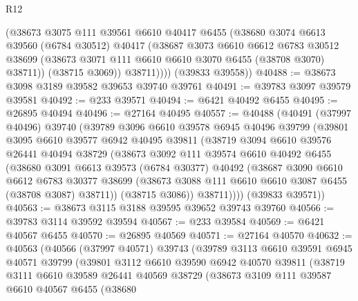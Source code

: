 \begin{lexlean}{R12}
\begin{coremodule}
            (@38673
              @3075
              @111
              @39561
              @6610
              @40417
              @6455
              (@38680
                @3074
                @6613
                @39560
                (@6784 @30512)
                @40417
                (@38687
                  @3073
                  @6610
                  @6612
                  @6783
                  @30512
                  @38699
                  (@38673 @3071 @111 @6610 @6610 @3070 @6455 (@38708 @3070) @38711))
                (@38715 @3069))
              @38711))))
      (@39833 @39558))
@40488 := @38673 @3098 @3189 @39582 @39653 @39740 @39761
@40491 := @39783 @3097 @39579 @39581
@40492 := @233 @39571
@40494 := @6421 @40492 @6455
@40495 := @26895 @40494
@40496 := @27164 @40495
@40557 := @40488
    (@40491
      (@37997 @40496)
      @39740
      (@39789
        @3096
        @6610
        @39578
        @6945
        @40496
        @39799
        (@39801
          @3095
          @6610
          @39577
          @6942
          @40495
          @39811
          (@38719
            @3094
            @6610
            @39576
            @26441
            @40494
            @38729
            (@38673
              @3092
              @111
              @39574
              @6610
              @40492
              @6455
              (@38680
                @3091
                @6613
                @39573
                (@6784 @30377)
                @40492
                (@38687
                  @3090
                  @6610
                  @6612
                  @6783
                  @30377
                  @38699
                  (@38673 @3088 @111 @6610 @6610 @3087 @6455 (@38708 @3087) @38711))
                (@38715 @3086))
              @38711))))
      (@39833 @39571))
@40563 := @38673 @3115 @3188 @39595 @39652 @39743 @39760
@40566 := @39783 @3114 @39592 @39594
@40567 := @233 @39584
@40569 := @6421 @40567 @6455
@40570 := @26895 @40569
@40571 := @27164 @40570
@40632 := @40563
    (@40566
      (@37997 @40571)
      @39743
      (@39789
        @3113
        @6610
        @39591
        @6945
        @40571
        @39799
        (@39801
          @3112
          @6610
          @39590
          @6942
          @40570
          @39811
          (@38719
            @3111
            @6610
            @39589
            @26441
            @40569
            @38729
            (@38673
              @3109
              @111
              @39587
              @6610
              @40567
              @6455
              (@38680

\end{coremodule}
\end{lexlean}
